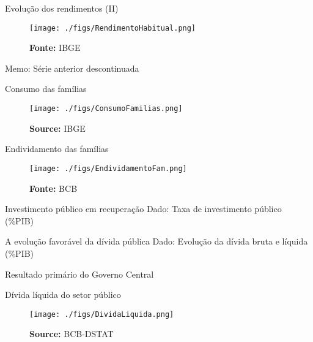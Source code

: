 \documentclass[presentation]{beamer}
\begin{document}
\begin{frame}[label={sec:org9bc5777}]{Evolução dos rendimentos (II)}
\begin{figure}[htb]
\centering
\caption{Massa de rendimento real habitual de todos os trabalhos} 
\texttt{[image: ./figs/RendimentoHabitual.png]}
\label{fig:RendimentoH}
\caption*{\textbf{Fonte:} IBGE}
\end{figure}

\alert{Memo:} Série anterior descontinuada
\end{frame}

\begin{frame}[label={sec:orgd4850b0}]{Consumo das famílias}
\begin{figure}[htb]
\centering
\caption{Consumo das famílias\\Jan/1995=100} 
\texttt{[image: ./figs/ConsumoFamilias.png]}
\label{fig:Consumo}
\caption*{\textbf{Source:} IBGE}
\end{figure}
\end{frame}

\begin{frame}[label={sec:org2b1bd48}]{Endividamento das famílias}
\begin{figure}[htb]
\centering
\caption{Endividamento das famílias\\em \% do PIB} 
\texttt{[image: ./figs/EndividamentoFam.png]}
\label{fig:Endiv}
\caption*{\textbf{Fonte:} BCB}
\end{figure}
\end{frame}


\begin{frame}[label={sec:org2868f60}]{Investimento público em recuperação}
\alert{Dado:} Taxa de investimento público (\%PIB)
\end{frame}

\begin{frame}[label={sec:org75c283f}]{A evolução favorável da dívida pública}
\alert{Dado:} Evolução da dívida bruta e líquida (\%PIB)
\end{frame}

\begin{frame}[label={sec:org810ffa2}]{Resultado primário do Governo Central}
\end{frame}

\begin{frame}[label={sec:orgad7d032}]{Dívida líquida do setor público}
\begin{figure}[htb]
\centering
\caption{Dívida líquida do Governo Federal e Banco Central\\em \% do PIB} 
\texttt{[image: ./figs/DividaLiquida.png]}
\label{fig:divliq}
\caption*{\textbf{Source:} BCB-DSTAT}
\end{figure}
\end{frame}
\end{document}
